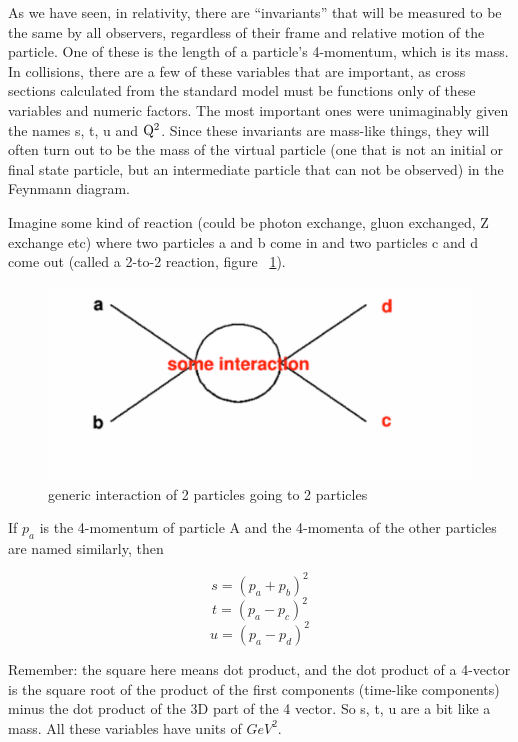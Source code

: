 As we have seen, in relativity, there are ``invariants'' that will be 
measured to be the same by all observers, regardless of 
their frame and relative motion of the particle.  One of these is the length of a particle's 4-momentum, which is its mass.  In collisions, there are a few of these variables that are important, as cross sections calculated from the standard model must be functions only of these variables and numeric factors.  The most important ones were unimaginably given the names s, t, u and 
${\rm Q^2}$.  Since these invariants are mass-like things, they will often turn out to be the mass of the virtual particle (one that is not an initial or final state particle, but an intermediate particle that can not be observed) in the Feynmann diagram.

  
Imagine some kind of reaction (could be photon exchange, gluon exchanged, Z exchange etc) where two particles a and b come in and two particles c and d come out  (called a 2-to-2 reaction, figure ~\ref{fig:twototwo}).

\begin{figure}[h]
\centering\includegraphics[scale=0.5]{./protonprotoncollisions/Pictures/fig1.pdf}
\caption{generic interaction of 2 particles going to 2 particles}
\label{fig:twototwo}
\end{figure}

If \(p_{a}\) is the 4-momentum of particle A and the 4-momenta of the other particles are named similarly, then

\begin{equation}s=(p_{a}+p_{b})^{2}\end{equation}
\begin{equation}t=(p_{a}-p_{c})^{2}\end{equation}
\begin{equation}u=(p_{a}-p_{d})^{2}\end{equation}

Remember: the square here means dot product, and the dot product of a 4-vector is the square root of the product of the first components (time-like components) minus the dot product of the 3D part of the 4 vector.  So s, t, u are a bit like a mass.  All these variables have units of \(GeV^{2}\).

